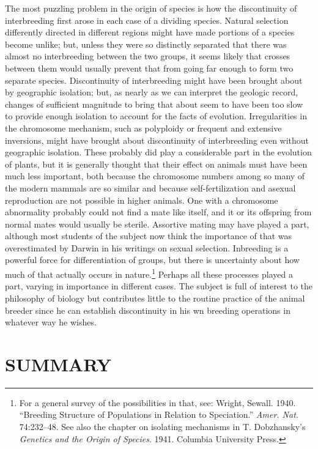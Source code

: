 The most puzzling problem in the origin of species is how the discontinuity
of interbreeding first arose in each case of a dividing species. Natural
selection differently directed in different regions might have made portions
of a species become unlike; but, unless they were so distinctly separated
that there was almost no interbreeding between the two groups, it seems likely
that crosses between them would usually prevent that from going far enough to
form two separate species. Discontinuity of interbreeding might have been brought
about by geographic isolation; but, as nearly as we can interpret the geologic
record, changes of sufficient magnitude to bring that about seem to have been too
slow to provide enough isolation to account for the facts of evolution.
Irregularities in the chromosome mechanism, such as polyploidy or frequent and
extensive inversions, might have brought about discontinuity of interbreeding even
without geographic isolation. These probably did play a considerable part in the
evolution of plants, but it is generally thought that their effect on animals must
have been much less important, both because the chromosome numbers among so many
of the modern mammals are so similar and because self-fertilization and asexual
reproduction are not possible in higher animals. One with a chromosome abnormality
probably could not find a mate like itself, and it or its offspring from normal
mates would usually be sterile. Assortive mating may have played a part, although
most students of the subject now think the importance of that was overestimated by
Darwin in his writings on sexual selection. Inbreeding is a powerful force for
differentiation of groups, but there is uncertainty about how much of that
actually occurs in nature.\footnote{For a general survey of the possibilities in
that, see: Wright, Sewall. 1940. ``Breeding Structure of Populations in Relation
to Speciation.'' \textit{Amer. Nat.} 74:232--48. See also the chapter on isolating
mechanisms in T. Dobzhansky's \textit{Genetics and the Origin of Species}. 1941.
Columbia University Press.} Perhaps all these processes played a part, varying in
importance in different cases. The subject is full of interest to the philosophy
of biology but contributes little to the routine practice of the animal breeder
since he can establish discontinuity in his wn breeding operations in whatever
way he wishes.

\section*{SUMMARY}

